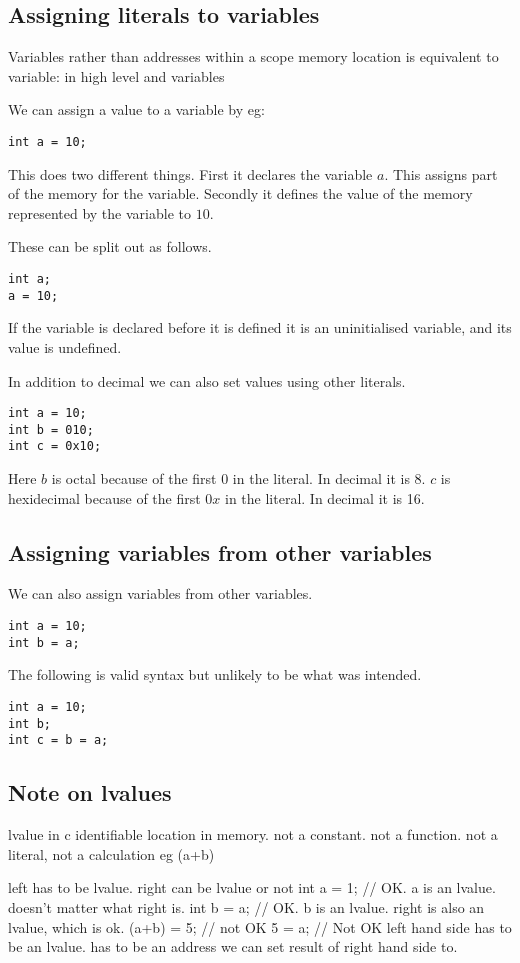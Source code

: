 
\subsection{Assigning literals to variables}

Variables rather than addresses
within a scope memory location is equivalent to variable: in high level and variables


We can assign a value to a variable by eg:

\begin{verbatim}
int a = 10;
\end{verbatim}

This does two different things. First it declares the variable \(a\). This assigns part of the memory for the variable.
Secondly it defines the value of the memory represented by the variable to \(10\).

These can be split out as follows.

\begin{verbatim}
int a;
a = 10;
\end{verbatim}

If the variable is declared before it is defined it is an uninitialised variable, and its value is undefined.

In addition to decimal we can also set values using other literals.

\begin{verbatim}
int a = 10;
int b = 010;
int c = 0x10;
\end{verbatim}

Here \(b\) is octal because of the first \(0\) in the literal. In decimal it is 8.
\(c\) is hexidecimal because of the first \(0x\) in the literal. In decimal it is 16.




\subsection{Assigning variables from other variables}

We can also assign variables from other variables.

\begin{verbatim}
int a = 10;
int b = a;
\end{verbatim}

The following is valid syntax but unlikely to be what was intended.
\begin{verbatim}
int a = 10;
int b;
int c = b = a;
\end{verbatim}


\subsection{Note on lvalues}

lvalue in c
identifiable location in memory. not a constant. not a function. not a literal, not a calculation  eg (a+b)

left has to be lvalue. right can be lvalue or not
int a = 1; // OK. a is an lvalue. doesn't matter what right is.
int b = a; // OK. b is an lvalue. right is also an lvalue, which is ok.
(a+b) = 5; // not OK
5 = a; // Not OK
left hand side has to be an lvalue. has to be an address we can set result of right hand side to.

